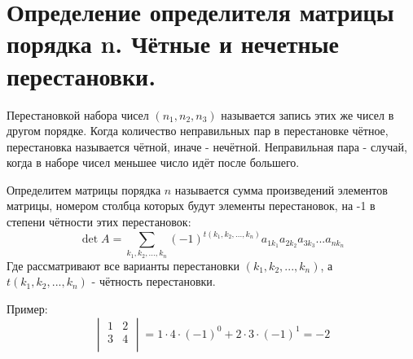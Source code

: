 \documentclass[12pt]{article}
\begin{document}
\begin{sloppypar}
    \section{Определение определителя матрицы порядка n. Чётные и нечетные перестановки.}
    Перестановкой набора чисел $(n_1, n_2, n_3)$ называется запись этих же чисел в другом порядке. Когда количество неправильных пар в перестановке чётное, перестановка называется чётной, иначе - нечётной. Неправильная пара - случай, когда в наборе чисел меньшее число идёт после большего.

    Определитем матрицы порядка $n$ называется сумма произведений элементов матрицы, номером столбца которых будут элементы перестановок, на -1 в степени чётности этих перестановок:
    \[
        \det A = \sum_{k_1, k_2, ..., k_n}(-1)^{t(k_1,k_2,...,k_n)}a_{1k_1}a_{2k_2}a_{3k_3}...a_{nk_n}
    \]
    Где рассматривают все варианты перестановки $(k_1, k_2, ..., k_n)$, а $t(k_1,k_2,...,k_n)$ - чётность перестановки.

    Пример:
    \[
        \begin{vmatrix}
            1 & 2 \\
            3 & 4 \\
        \end{vmatrix} = 1 \cdot 4 \cdot (-1)^0 + 2 \cdot 3 \cdot (-1)^1 = -2
    \]


\end{sloppypar}
\end{document}
